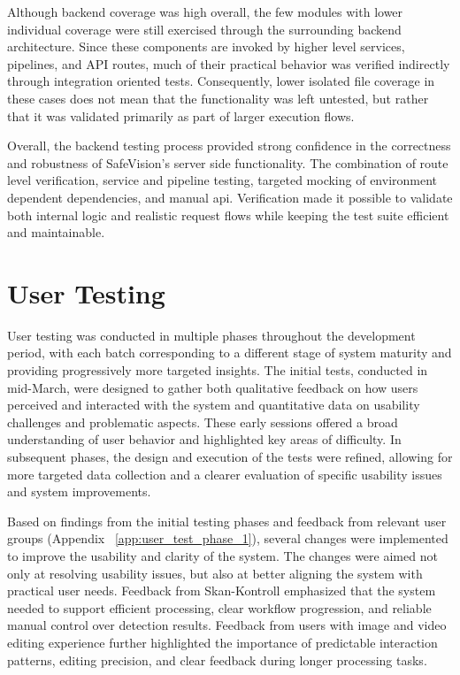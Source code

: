 Although backend coverage was high overall, the few modules with lower individual coverage were still exercised through the surrounding backend architecture. Since these components are invoked by higher level services, pipelines, and API routes, much of their practical behavior was verified indirectly through integration oriented tests. Consequently, lower isolated file coverage in these cases does not mean that the functionality was left untested, but rather that it was validated primarily as part of larger execution flows.

Overall, the backend testing process provided strong confidence in the correctness and robustness of \gls{SafeVision}'s server side functionality. The combination of route level verification, service and pipeline testing, targeted mocking of environment dependent dependencies, and manual \acrshort{api}. Verification made it possible to validate both internal logic and realistic request flows while keeping the test suite efficient and maintainable.

\section{User Testing}
\label{sec:user-testing}

User testing was conducted in multiple phases throughout the development period, with each batch corresponding to a different stage of system maturity and providing progressively more targeted insights. The initial tests, conducted in mid-March, were designed to gather both qualitative feedback on how users perceived and interacted with the system and quantitative data on usability challenges and problematic aspects. These early sessions offered a broad understanding of user behavior and highlighted key areas of difficulty. In subsequent phases, the design and execution of the tests were refined, allowing for more targeted data collection and a clearer evaluation of specific usability issues and system improvements.


Based on findings from the initial testing phases and feedback from relevant user groups (Appendix ~\ref{app:user_test_phase_1}), several changes were implemented to improve the usability and clarity of the system. The changes were aimed not only at resolving usability issues, but also at better aligning the system with practical user needs. Feedback from Skan-Kontroll emphasized that the system needed to support efficient processing, clear workflow progression, and reliable manual control over detection results. Feedback from users with image and video editing experience further highlighted the importance of predictable interaction patterns, editing precision, and clear feedback during longer processing tasks.

